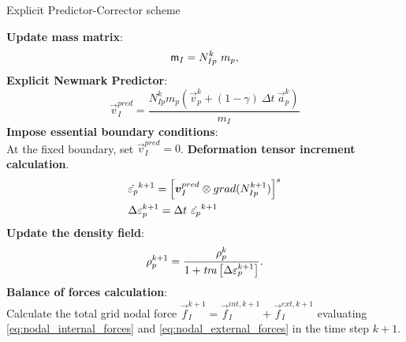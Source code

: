 \begin{algorithm}
  \renewcommand{\thealgorithm}{}
  \caption{Explicit Predictor-Corrector scheme}
  \begin{algorithmic}[1]
    \STATE \textbf{Update mass matrix}:
    \begin{equation*}
      \mathsf{m}_{I} = N_{Ip}^{k}\ m_p,
    \end{equation*}
    \STATE \textbf{Explicit Newmark Predictor}:\\
    \begin{equation*}
      \vec{v}_I^{pred} = \frac{ N_{Ip}^{k} m_p (\vec{v}_p^k + (1 - \gamma)\ \Delta t\ \vec{a}_p^k)}{m_I}
    \end{equation*}
    \STATE \textbf{Impose essential boundary conditions}:\\
    At the fixed boundary, set $\vec{v}_{I}^{pred} = 0$. 
    \STATE \textbf{Deformation tensor increment calculation}.
    \begin{align*}
      &\dot{\tens{\varepsilon}_{p}}^{k+1} = \left[ \vec{v}_{I}^{pred} \otimes
        \Grad{N_{Ip}^{k+1}} \right]^s \\
      &\Delta \tens{\varepsilon}_{p}^{k+1} = \Delta t\ \dot{\tens{\varepsilon}_{p}}^{k+1}
    \end{align*}
    \STATE \textbf{Update the density field}:
    \begin{equation*}
      \rho_p^{k+1} = \frac{\rho_p^k}{1 + \mathit{tra}\left[\Delta\mathsf{\varepsilon}_{p}^{k+1}\right]}.
    \end{equation*}
    \STATE \textbf{Balance of forces calculation}:\\
    Calculate the total grid nodal force $\vec{f}_{I}^{k+1} =
    \vec{f}_{I}^{int,k+1} + \vec{f}_{I}^{ext,k+1}$ evaluating
    \eqref{eq:nodal_internal_forces} and
    \eqref{eq:nodal_external_forces} in the time step $k+1$.

\end{algorithmic}
\end{algorithm}
